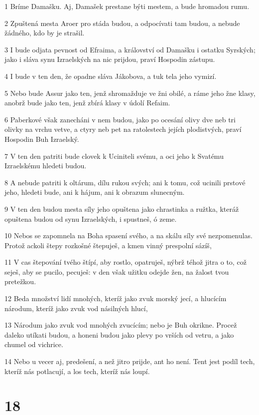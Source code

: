 \par 1 Bríme Damašku. Aj, Damašek prestane býti mestem, a bude hromadou rumu.
\par 2 Zpuštená mesta Aroer pro stáda budou, a odpocívati tam budou, a nebude žádného, kdo by je strašil.
\par 3 I bude odjata pevnost od Efraima, a království od Damašku i ostatku Syrských; jako i sláva synu Izraelských na nic prijdou, praví Hospodin zástupu.
\par 4 I bude v ten den, že opadne sláva Jákobova, a tuk tela jeho vymizí.
\par 5 Nebo bude Assur jako ten, jenž shromažduje ve žni obilé, a ráme jeho žne klasy, anobrž bude jako ten, jenž zbírá klasy v údolí Refaim.
\par 6 Paberkové však zanecháni v nem budou, jako po ocesání olivy dve neb tri olivky na vrchu vetve, a ctyry neb pet na ratolestech jejích plodistvých, praví Hospodin Buh Izraelský.
\par 7 V ten den patriti bude clovek k Uciniteli svému, a oci jeho k Svatému Izraelskému hledeti budou.
\par 8 A nebude patriti k oltárum, dílu rukou svých; ani k tomu, což ucinili prstové jeho, hledeti bude, ani k hájum, ani k obrazum slunecným.
\par 9 V ten den budou mesta síly jeho opuštena jako chrastinka a ružtka, kteráž opuštena budou od synu Izraelských, i spustneš, ó zeme.
\par 10 Nebos se zapomnela na Boha spasení svého, a na skálu síly své nezpomenulas. Protož ackoli štepy rozkošné štepuješ, a kmen vinný prespolní sázíš,
\par 11 V cas štepování tvého štípí, aby rostlo, opatruješ, nýbrž téhož jitra o to, což seješ, aby se pucilo, pecuješ: v den však užitku odejde žen, na žalost tvou pretežkou.
\par 12 Beda množství lidí mnohých, kteríž jako zvuk morský jecí, a hlucícím národum, kteríž jako zvuk vod násilných hlucí,
\par 13 Národum jako zvuk vod mnohých zvucícím; nebo je Buh okrikne. Procež daleko utíkati budou, a honeni budou jako plevy po vrších od vetru, a jako chumel od vichrice.
\par 14 Nebo u vecer aj, predešení, a než jitro prijde, ant ho není. Tent jest podíl tech, kteríž nás potlacují, a los tech, kteríž nás loupí.

\chapter{18}

